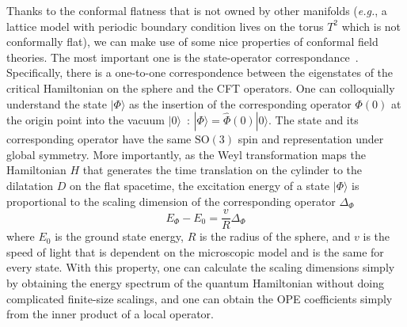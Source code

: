 \documentclass{timesjhep}
\begin{document}
Thanks to the conformal flatness that is not owned by other manifolds (\textit{e.g.}, a lattice model with periodic boundary condition lives on the torus $T^2$ which is not conformally flat), we can make use of some nice properties of conformal field theories. The most important one is the state-operator correspondance~\cite{Pappadopulo2012Radial,Rychkov2016CFT,SimmonsDuffin2016CFT}. Specifically, there is a one-to-one correspondence between the eigenstates of the critical Hamiltonian on the sphere and the CFT operators. One can colloquially understand the state $|\Phi\rangle$ as the insertion of the corresponding operator $\Phi(0)$ at the origin point into the vacuum $|0\rangle$~: $|\Phi\rangle=\hat{\Phi}(0)|0\rangle$. The state and its corresponding operator have the same $\mathrm{SO}(3)$ spin and representation under global symmetry. More importantly, as the Weyl transformation maps the Hamiltonian $H$ that generates the time translation on the cylinder to the dilatation $D$ on the flat spacetime, the excitation energy of a state $|\Phi\rangle$ is proportional to the scaling dimension of the corresponding operator $\Delta_\Phi$ 
\begin{equation}
    E_\Phi-E_0=\frac{v}{R}\Delta_\Phi
\end{equation}
where $E_0$ is the ground state energy, $R$ is the radius of the sphere, and $v$ is the speed of light that is dependent on the microscopic model and is the same for every state. With this property, one can calculate the scaling dimensions simply by obtaining the energy spectrum of the quantum Hamiltonian without doing complicated finite-size scalings, and one can obtain the OPE coefficients simply from the inner product of a local operator. 
\end{document}
